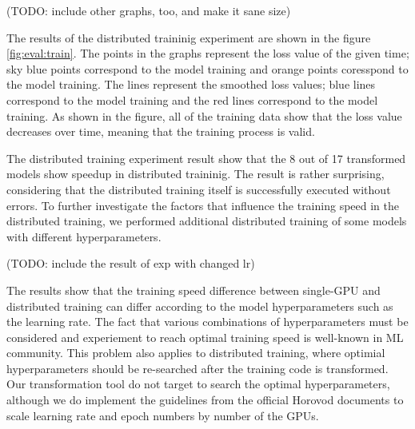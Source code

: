 (TODO: include other graphs, too, and make it sane size)

The results of the distributed traininig experiment 
are shown in the figure \ref{fig:eval:train}.
The points in the graphs represent the loss value of the given time;
sky blue points correspond to the \orgbf model training and
orange points coresspond to the \hvdbf model training.
The lines represent the smoothed loss values;
blue lines correspond to the \orgbf model training
and the red lines correspond to the \hvdbf model training.
As shown in the figure, all of the training data show that
the loss value decreases over time, meaning that the training
process is valid.

The distributed training experiment result show that the 8 out of 17 transformed
models show speedup in distributed traininig. The result is rather surprising,
considering that the distributed training itself is successfully executed
without errors. To further investigate the factors that influence the
training speed in the distributed training, 
we performed additional distributed training of some models with
different hyperparameters.

(TODO: include the result of exp with changed lr)

The results show that the training speed difference between single-GPU and
distributed training can differ according to the model hyperparameters
such as the learning rate. The fact that various combinations of hyperparameters
must be considered and experiement to reach optimal training speed is 
well-known in ML community. This problem also applies to distributed training,
where optimial hyperparameters should be re-searched after the training
code is transformed. Our transformation tool do not target to search the 
optimal hyperparameters, although we do implement the guidelines from the
official Horovod documents to scale learning rate and epoch numbers
by number of the GPUs.  
